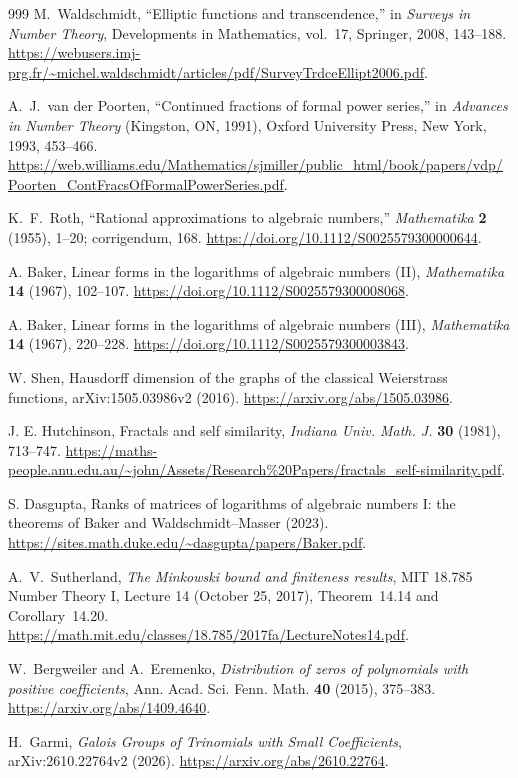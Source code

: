\documentclass[11pt,a4paper]{article}
\theoremstyle{definition}
\theoremstyle{remark}
\numberwithin{equation}{section}
\begin{document}
\begin{thebibliography}{999}
M.~Waldschmidt, ``Elliptic functions and transcendence,''
in \emph{Surveys in Number Theory}, Developments in Mathematics,
vol.~17, Springer, 2008, 143--188.
\url{https://webusers.imj-prg.fr/~michel.waldschmidt/articles/pdf/SurveyTrdceEllipt2006.pdf}.

A.~J.~van der Poorten, ``Continued fractions of formal power series,''
in \emph{Advances in Number Theory} (Kingston, ON, 1991),
Oxford University Press, New York, 1993, 453--466.
\url{https://web.williams.edu/Mathematics/sjmiller/public_html/book/papers/vdp/Poorten_ContFracsOfFormalPowerSeries.pdf}.

K.~F.~Roth, ``Rational approximations to algebraic numbers,''
\emph{Mathematika} \textbf{2} (1955), 1--20; corrigendum, 168.
\url{https://doi.org/10.1112/S0025579300000644}.

A. Baker, Linear forms in the logarithms of algebraic numbers (II),
\emph{Mathematika} \textbf{14} (1967), 102--107.
\url{https://doi.org/10.1112/S0025579300008068}.

A. Baker, Linear forms in the logarithms of algebraic numbers (III),
\emph{Mathematika} \textbf{14} (1967), 220--228.
\url{https://doi.org/10.1112/S0025579300003843}.

W. Shen, Hausdorff dimension of the graphs of the classical Weierstrass
functions, arXiv:1505.03986v2 (2016).
\url{https://arxiv.org/abs/1505.03986}.

J. E. Hutchinson, Fractals and self similarity,
\emph{Indiana Univ. Math. J.} \textbf{30} (1981), 713--747.
\url{https://maths-people.anu.edu.au/~john/Assets/Research%20Papers/fractals_self-similarity.pdf}.

S. Dasgupta, Ranks of matrices of logarithms of algebraic numbers I:
the theorems of Baker and Waldschmidt--Masser (2023).
\url{https://sites.math.duke.edu/~dasgupta/papers/Baker.pdf}.

A.~V.~Sutherland,
\emph{The Minkowski bound and finiteness results},
MIT 18.785 Number Theory I, Lecture 14 (October 25, 2017),
Theorem~14.14 and Corollary~14.20.
\url{https://math.mit.edu/classes/18.785/2017fa/LectureNotes14.pdf}.

W.~Bergweiler and A.~Eremenko,
\emph{Distribution of zeros of polynomials with positive coefficients},
Ann. Acad. Sci. Fenn. Math. \textbf{40} (2015), 375--383.
\url{https://arxiv.org/abs/1409.4640}.

H.~Garmi,
\emph{Galois Groups of Trinomials with Small Coefficients},
arXiv:2610.22764v2 (2026).
\url{https://arxiv.org/abs/2610.22764}.


\end{thebibliography}
\end{document}
